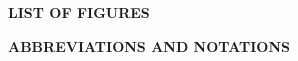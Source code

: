 \makeatletter
{}  %
\makeatother

\newpage
\doublespacing %


\newpage
\begin{center}
    \fontsize{14}{16}\selectfont
    \textbf{LIST OF FIGURES}
\end{center}
\vspace{0.5cm}
\singlespacing %

\makeatletter
{}  %
\makeatother

\newpage
\doublespacing %


\newpage
\begin{center}
    \fontsize{14}{16}\selectfont
    \textbf{ABBREVIATIONS AND NOTATIONS}
\end{center}
\vspace{0.5cm}
\doublespacing
\justifying


